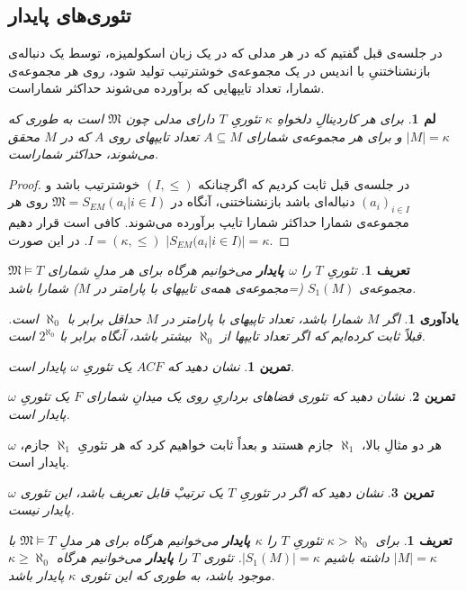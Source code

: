 \documentclass[12pt,a4paper]{report}
\theoremstyle{colorhead}
\newtheorem{tam}{تمرین}
\newtheorem{defn}[thm]{تعریف}
\newtheorem{yad}[thm]{یادآوری}
\newtheorem{lem}[thm]{لم}
\begin{document}
\subsection{تئوری‌های پایدار}
در جلسه‌ی قبل گفتیم که در هر مدلی
که 
در یک زبان اسکولمیزه، توسط یک دنباله‌ی بازنشناختنیِ با اندیس در یک
مجموعه‌ی خوشترتیب تولید شود، 
روی هر مجموعه‌ی شمارا، تعداد تایپهایی که برآورده می‌شوند
حداکثر شماراست.
\begin{lem}
\label{shomaratype}
برای هر کاردینالِ دلخواهِ
$\kappa$
تئوریِ
$T$
دارای مدلی چون
$\mathfrak{M}$
است به طوری که 
$|M|=\kappa$
و برای هر مجموعه‌ی شمارای
$A\subseteq M$
تعداد تایپهای
روی
$A$
که در
$M$
محقق می‌شوند،‌ حداکثر شماراست. 
\end{lem}
\begin{proof}
در جلسه‌ی قبل ثابت کردیم که اگرچنانکه
$(I,\leq)$
خوشترتیب باشد و
$(a_i)_{i\in I}$
دنباله‌ای باشد بازنشناختنی، آنگاه در
$\mathfrak{M}=S_{EM}(a_i|i\in I)$
روی هر مجموعه‌ی شمارا حداکثر شمارا تایپ برآورده می‌شوند. کافی است قرار دهیم
$I=(\kappa,\leq)$.
در این صورت
\mbox{$|S_{EM}(a_i|i\in I)|=\kappa$}.
\end{proof}
\begin{defn}
تئوریِ
$T$
را
\textbf{$\omega$
پایدار}
 می‌خوانیم هرگاه برای هر مدلِ شمارای
$\mathfrak{M}\models T$
مجموعه‌ی
$S_1(M)$
(=مجموعه‌ی همه‌ی تایپهای با پارامتر در
$M$)
شمارا باشد. 
\end{defn}
\begin{yad}
اگر
$M$
شمارا باشد،
تعداد تاپیهای با پارامتر در
$M$
حداقل برابر 	 با
$\aleph_0$
است.
 قبلاً ثابت کرده‌ایم که اگر تعداد تایپها از
$\aleph_0$
بیشتر باشد، آنگاه برابر با
$2^{\aleph_0}$
است. 
\end{yad}
\begin{tam}
نشان دهید که
$ACF$
یک تئوریِ
$\omega$
پایدار است. 
\end{tam}
\begin{tam}
نشان دهید که تئوری فضاهای برداریِ روی یک میدانِ شمارای
$F$
یک تئوریِ
$\omega$
پایدار است. 
\end{tam}
هر دو مثالِ بالا،
$\aleph_1$
جازم هستند و بعداً ‌ثابت خواهیم کرد که هر تئوریِ
$\aleph_1$
جازم،
$\omega$
پایدار است.
\begin{tam}
نشان دهید که اگر در تئوریِ
$T$
یک
ترتیبْ قابل تعریف باشد، این تئوری
$\omega$
پایدار نیست.
\end{tam}
\begin{defn}
برای
$\kappa>\aleph_0$
تئوریِ
$T$
را
\textbf{$\kappa$
پایدار}
می‌خوانیم هرگاه  برای هر مدلِ
$\mathfrak{M}\models T$
با
$|M|=\kappa$
داشته باشیم
$|S_1(M)|=\kappa$.
تئوری
$T$
را 
\textbf{پایدار }
می‌خوانیم هرگاه
$\kappa\geq \aleph_0$
موجود باشد، به طوری که این تئوری
$\kappa$
پایدار باشد. 
\end{defn}
\end{document}
